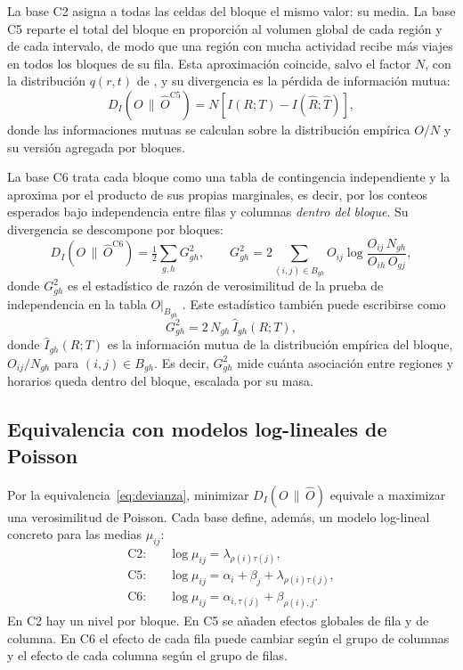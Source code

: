 La base C2 asigna a todas las celdas del bloque el mismo valor: su media. La base
C5 reparte el total del bloque en proporción al volumen global de cada región y de
cada intervalo, de modo que una región con mucha actividad recibe más viajes en
todos los bloques de su fila. Esta aproximación coincide, salvo el factor $N$, con
la distribución $q(r,t)$ de \cite{Dhillon2003}, y su divergencia es la pérdida de información
mutua:
\begin{equation}\label{eq:perdida-im}
  D_I\!\left(O \,\|\, \hat{O}^{\mathrm{C5}}\right) = N \left[ I(R;T) - I(\hat{R};\hat{T}) \right],
\end{equation}
donde las informaciones mutuas se calculan sobre la distribución empírica $O/N$ y
su versión agregada por bloques.

La base C6 trata cada bloque como una tabla de contingencia independiente y la
aproxima por el producto de sus propias marginales, es decir, por los conteos
esperados bajo independencia entre filas y columnas \emph{dentro del bloque}. Su
divergencia se descompone por bloques:
\begin{equation}\label{eq:c6-g2}
  D_I\!\left(O \,\|\, \hat{O}^{\mathrm{C6}}\right)
  = \tfrac{1}{2} \sum_{g,h} G^2_{gh}, \qquad
  G^2_{gh} = 2 \sum_{(i,j) \in B_{gh}} O_{ij} \log \frac{O_{ij}\, N_{gh}}{O_{ih}\, O_{gj}},
\end{equation}
donde $G^2_{gh}$ es el estadístico de razón de verosimilitud de la prueba de
independencia en la tabla $O|_{B_{gh}}$ \cite[Sec.~3.2.1, ec.~3.11]{Agresti2013}.
Este estadístico también puede escribirse como
\begin{equation}\label{eq:g2-im}
  G^2_{gh} = 2\, N_{gh}\, \hat{I}_{gh}(R;T),
\end{equation}
donde $\hat{I}_{gh}(R;T)$ es la información mutua de la distribución empírica del
bloque, $O_{ij}/N_{gh}$ para $(i,j) \in B_{gh}$. Es decir, $G^2_{gh}$ mide cuánta
asociación entre regiones y horarios queda dentro del bloque, escalada por su masa.

\subsection{Equivalencia con modelos log-lineales de Poisson}\label{sec:loglineal}

Por la equivalencia~\eqref{eq:devianza}, minimizar $D_I(O \,\|\, \hat{O})$ equivale a
maximizar una verosimilitud de Poisson. Cada base define, además, un modelo
log-lineal concreto para las medias $\mu_{ij}$:
\begin{align}
  \text{C2:}\quad & \log \mu_{ij} = \lambda_{\rho(i)\tau(j)}, \label{eq:ll-c2}\\
  \text{C5:}\quad & \log \mu_{ij} = \alpha_i + \beta_j + \lambda_{\rho(i)\tau(j)}, \label{eq:ll-c5}\\
  \text{C6:}\quad & \log \mu_{ij} = \alpha_{i,\tau(j)} + \beta_{\rho(i),j}. \label{eq:ll-c6}
\end{align}
En C2 hay un nivel por bloque. En C5 se añaden efectos globales de fila y de
columna. En C6 el efecto de cada fila puede cambiar según el grupo de columnas y
el efecto de cada columna según el grupo de filas.

